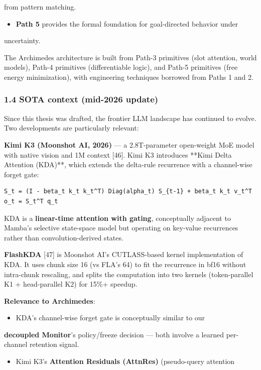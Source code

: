 \documentclass[11pt]{article}
\begin{document}
  from pattern matching.
\begin{itemize}
  \item \textbf{Path 5} provides the formal foundation for goal-directed behavior under
\end{itemize}

  uncertainty.

The Archimedes architecture is built from Path-3 primitives (slot attention, world
models), Path-4 primitives (differentiable logic), and Path-5 primitives (free
energy minimization), with engineering techniques borrowed from Paths 1 and 2.


\subsubsection{1.4 SOTA context (mid-2026 update)}

Since this thesis was drafted, the frontier LLM landscape has continued
to evolve. Two developments are particularly relevant:

\textbf{Kimi K3 (Moonshot AI, 2026)} — a 2.8T-parameter open-weight MoE model
with native vision and 1M context [46]. Kimi K3 introduces **Kimi Delta
Attention (KDA)**, which extends the delta-rule recurrence with a
channel-wise forget gate:

\begin{verbatim}
S_t = (I - beta_t k_t k_t^T) Diag(alpha_t) S_{t-1} + beta_t k_t v_t^T
o_t = S_t^T q_t
\end{verbatim}

KDA is a \textbf{linear-time attention with gating}, conceptually adjacent
to Mamba's selective state-space model but operating on key-value
recurrences rather than convolution-derived states.

\textbf{FlashKDA} [47] is Moonshot AI's CUTLASS-based kernel implementation
of KDA. It uses chunk size 16 (vs FLA's 64) to fit the recurrence in
bf16 without intra-chunk rescaling, and splits the computation into
two kernels (token-parallel K1 + head-parallel K2) for 15\%+ speedup.

\textbf{Relevance to Archimedes}:

\begin{itemize}
  \item KDA's channel-wise forget gate is conceptually similar to our
\end{itemize}

  \textbf{decoupled Monitor}'s policy/freeze decision — both involve a
  learned per-channel retention signal.
\begin{itemize}
  \item Kimi K3's \textbf{Attention Residuals (AttnRes)} (pseudo-query attention
\end{itemize}
\end{document}

